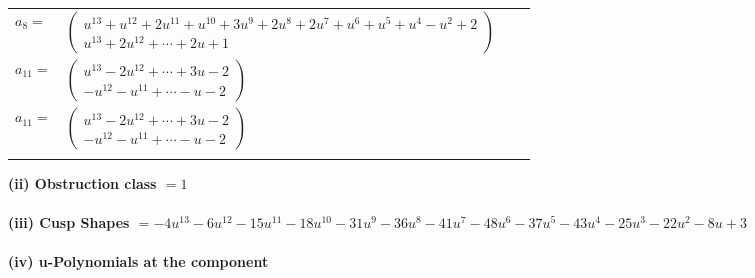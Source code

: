 \documentclass[1p]{elsarticle_modified}
\theoremstyle{definition}
\begin{document}
\begin{tabular}{m{7pt} m{180pt} m{7pt} m{180pt} }
\flushright $a_{8}=$&$\begin{pmatrix}u^{13}+u^{12}+2 u^{11}+u^{10}+3 u^9+2 u^8+2 u^7+u^6+u^5+u^4- u^2+2\\u^{13}+2 u^{12}+\cdots+2 u+1\end{pmatrix}$ \\
\flushright $a_{11}=$&$\begin{pmatrix}u^{13}-2 u^{12}+\cdots+3 u-2\\- u^{12}- u^{11}+\cdots- u-2\end{pmatrix}$\\ \flushright $a_{11}=$&$\begin{pmatrix}u^{13}-2 u^{12}+\cdots+3 u-2\\- u^{12}- u^{11}+\cdots- u-2\end{pmatrix}$\\&\end{tabular}
\flushleft \textbf{(ii) Obstruction class $= 1$}\\~\\
\flushleft \textbf{(iii) Cusp Shapes $= -4 u^{13}-6 u^{12}-15 u^{11}-18 u^{10}-31 u^9-36 u^8-41 u^7-48 u^6-37 u^5-43 u^4-25 u^3-22 u^2-8 u+3$}\\~\\
\newpage\renewcommand{\arraystretch}{1}
\flushleft \textbf{(iv) u-Polynomials at the component}\newline \\
\end{document}
